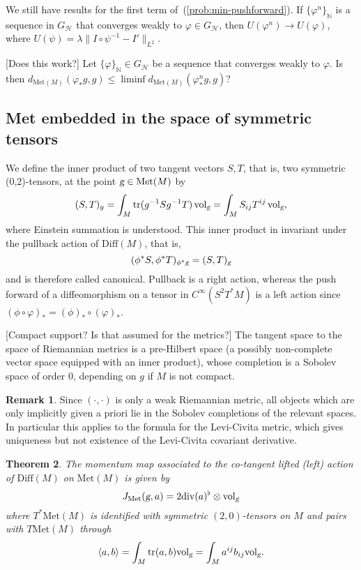 \documentclass{article}
\theoremstyle{plain}
\newtheorem{teo}{Theorem}[section]
\theoremstyle{definition}
\newtheorem{oss}[teo]{Remark}
\numberwithin{equation}{section}
\newcommand{\N}{\ensuremath{\mathbb{N}}}
\newcommand{\g}{\ensuremath{\textsl{g}}}
\newcommand{\Diff}{\ensuremath{\mathrm{Diff}}}
\newcommand{\Met}{\ensuremath{\mathrm{Met}}}
\newcommand{\Div}{\ensuremath{\mathrm{div}}}
\newcommand{\Vol}{\ensuremath{\mathrm{vol}}}
\newcommand{\tr}{\ensuremath{\mathrm{tr}}}
\begin{document}
We still have results for the first term of~(\ref{prob:min-pushforward}). If $\{\varphi^n\}_\N$ is a sequence in $G_\mathcal{H}$ that converges weakly to $\varphi\in G_\mathcal{H}$, then $U(\varphi^n)\to U(\varphi)$, where $U(\psi)=\lambda\|I\circ\psi^{-1}-I'\|_{L^2}$.

[Does this work?] Let $\{\varphi\}_\N\in G_\mathcal{H}$ be a sequence that converges weakly to $\varphi$. Is then $d_{\mathrm{Met}(M)}(\varphi_*g,g)\leq \liminf d_{\mathrm{Met}(M)}(\varphi^n_*g,g)$?


\subsection[Met embedded]{Met embedded in the space of symmetric tensors}
We define the inner product of two tangent vectors $S,T$, that is, two symmetric (0,2)-tensors, at the point $\g\in\Met(M)$ by
\[
(S,T)_g=\int_M \tr(g^{-1}Sg^{-1}T)\,\Vol_\g = \int_M S_{ij}T^{ij}\,\Vol_\g,
\]
where Einstein summation is understood. This inner product in invariant under the pullback action of $\Diff(M)$, that is,
\[
(\phi^*S,\phi^*T)_{\phi^*\g}=(S,T)_\g
\]
and is therefore called canonical. Pullback is a right action, whereas the push forward of a diffeomorphism on a tensor in $C^\infty(S^2T^*M)$ is a left action since $(\phi\circ\varphi)_*=(\phi)_*\circ(\varphi)_*$. 

[Compact support? Is that assumed for the metrics?]
The tangent space to the space of Riemannian metrics is a pre-Hilbert space (a possibly non-complete vector space equipped with an inner product), whose completion is a Sobolev space of order $0$, depending on $g$ if $M$ is not compact.

\begin{oss}
Since $(\cdot,\cdot)$ is only a weak Riemannian metric, all objects which are only implicitly given a priori lie in the Sobolev completions of the relevant spaces. In particular this applies to the formula for the Levi-Civita metric, which gives uniqueness but not existence of the Levi-Civita covariant derivative.
\end{oss}

\begin{teo}
	The momentum map associated to  the co-tangent lifted (left) action  of $\Diff(M)$ on $\Met(M)$ is given by
	\[
	  J_\Met(\g,a)=2\Div (a)^\flat \otimes \Vol_\g  
	\]
	where $T^*\Met(M)$ is identified with  symmetric $(2,0)$-tensors on $M$ and  pairs with $T\Met(M)$ through
	\[
	\langle a,b\rangle = \int_M \tr (a,b)\Vol_\g=\int_M a^{ij}b_{ij}\Vol_\g.
	\]
\end{teo}
\end{document}

